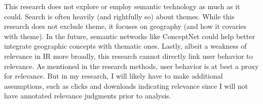 This research does not explore or employ semantic technology as much as it could. Search is often heavily (and rightfully so) about themes. While this research does not exclude theme, it focuses on geography (and how it covaries with theme). In the future, semantic networks like ConceptNet could help better integrate geographic concepts with thematic ones. Lastly, albeit a weakness of relevance in IR more broadly, this research cannot directly link user behavior to relevance. As mentioned in the research methods, user behavior is at best a proxy for relevance. But in my research, I will likely have to make additional assumptions, such as clicks and downloads indicating relevance since I will not have annotated relevance judgments prior to analysis.
